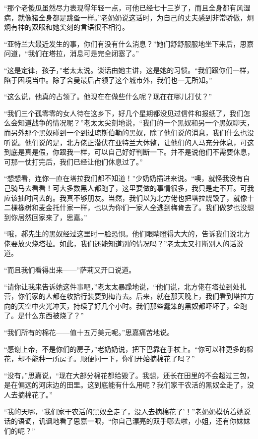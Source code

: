 \par “那个老傻瓜虽然尽力表现得年轻一点，可他已经七十三岁了，而且全身都有风湿病，就像猪全身都是跳蚤一样。”老奶奶说这话时，为自己的丈夫感到非常骄傲，炯炯有神的双眼和她尖刻的言语很不相符。
\par “亚特兰大最近发生的事，你们有没有什么消息？”她们舒舒服服地坐下来后，思嘉问道，“我们在塔拉，消息可是完全闭塞了。”
\par “这是定律，孩子，”老太太说。谈话由她主讲，这是她的习惯。“我们跟你们一样，陷于困境当中。除了舍曼最后占领了这个城市外，我们也一无所知。”
\par “这么说，他真的占领了。他现在在做些什么呢？现在在哪儿打仗？”
\par “我们三个孤零零的女人待在这乡下，好几个星期都没见过信件和报纸了，我们怎么会知道战争的情况呢？”老太太尖刻地说，“我们的一个黑奴和另一个黑奴聊天，而另外那个黑奴碰到一个到过琼斯伯勒的黑奴，除了他们说的消息，我们什么也没听说。他们说的是，北方佬正潜伏在亚特兰大休整，让他们的人马充分休息，可这到底是真是假，你跟我一样，可以自己好好判断一下。并不是说他们不需要休息，可那一仗打完后，我们已经让他们休息过了。”
\par “想想看，连你一直在塔拉我们都不知道！”少奶奶插进来说。“噢，就怪我没有自己骑马去看看！可大多数黑人都跑了，这里要做的事情很多，我只是走不开。可我应该抽时间去的。我真不够朋友。当然，我们以为北方佬也把塔拉烧毁了，就像十二棵橡树和麦金托什家一样，也以为你们一家人全逃到梅肯去了。我们做梦也没想到你居然回家来了，思嘉。”
\par “哦，郝先生的黑奴经过这里时一脸恐惧。他们眼睛瞪得大大的，告诉我们说北方佬要放火烧塔拉。如此，我们还能知道别的情况吗？”老太太又打断别人的话说道。
\par “而且我们看得出来——”萨莉又开口说道。
\par “请你让我来告诉她这件事吧，”老太太暴躁地说，“他们说，北方佬在塔拉到处扎营，你们家的人都在收拾行装要到梅肯去。后来，就在那天晚上，我们看到塔拉方向的天空中火光冲天，持续了好几个小时。我们那些蠢笨的黑奴都吓坏了，全跑了。是什么东西被烧了？”
\par “我们所有的棉花——值十五万美元呢。”思嘉痛苦地说。
\par “感谢上帝，不是你们的房子，”老奶奶说，把下巴靠在手杖上。“你可以种更多的棉花，却不能种一所房子。顺便问一下，你们开始摘棉花了吗？”
\par “没有，”思嘉说，“现在大部分棉花都给毁了。我想，还长在田里的不会超过三包，是在偏远的河床边的田里。这到底能有什么用呢？我们家干农活的黑奴全走了，没人去摘棉花了。”
\par “我的天哪，‘我们家干农活的黑奴全走了，没人去摘棉花了’！”老奶奶模仿着她说话的语调，讥讽地看了思嘉一眼，“你自己漂亮的双手哪去啦，小姐，还有你妹妹们的呢？”
